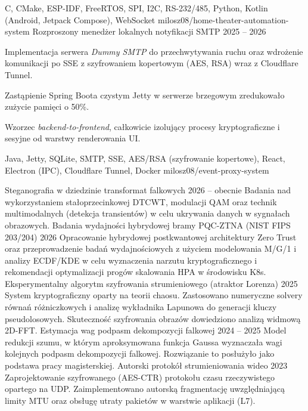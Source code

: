   {C, CMake, ESP-IDF, FreeRTOS, SPI, I2C, RS-232/485, Python, Kotlin (Android, Jetpack Compose), WebSocket}
  {milosz08/home-theater-automation-system}
\AddProjectEntry
  {Rozproszony menedżer lokalnych notyfikacji SMTP}
  {2025 -- 2026}
  {%
    \item
      Implementacja serwera \textit{Dummy SMTP} do przechwytywania ruchu oraz wdrożenie komunikacji po SSE z
      szyfrowaniem kopertowym (AES, RSA) wraz z Cloudflare Tunnel.
    \item
      Zastąpienie Spring Boota czystym Jetty w serwerze brzegowym zredukowało zużycie pamięci o 50\%.
    \item
      Wzorzec \textit{backend-to-frontend}, całkowicie izolujący procesy kryptograficzne i sesyjne od warstwy
      renderowania UI.
  }
  {Java, Jetty, SQLite, SMTP, SSE, AES/RSA (szyfrowanie kopertowe), React, Electron (IPC), Cloudflare Tunnel, Docker}
  {milosz08/event-proxy-system}


\newcommand{\IndependentResearchTitle}{Niezależna działaność badawcza}
\renewcommand{\ResearchList}{}
\AddResearchEntry
  {Steganografia w dziedzinie transformat falkowych}
  {2026 -- obecnie}
  {%
    Badania nad wykorzystaniem stałoprzecinkowej DTCWT, modulacji QAM oraz technik multimodalnych (detekcja transientów)
    w celu ukrywania danych w sygnałach obrazowych.
  }
\AddResearchEntry
  {Badania wydajności hybrydowej bramy PQC-ZTNA (NIST FIPS 203/204)}
  {2026}
  {%
    Opracowanie hybrydowej postkwantowej architektury Zero Trust oraz przeprowadzenie badań wydajnościowych z użyciem
    modelowania M/G/1 i analizy ECDF/KDE w celu wyznaczenia narzutu kryptograficznego i rekomendacji optymalizacji
    progów skalowania HPA w środowisku K8s.
  }
\AddResearchEntry
  {Eksperymentalny algorytm szyfrowania strumieniowego (atraktor Lorenza)}
  {2025}
  {%
    System kryptograficzny oparty na teorii chaosu. Zastosowano numeryczne solvery równań różniczkowych i analizę
    wykładnika Lapunowa do generacji kluczy pseudolosowych. Skuteczność szyfrowania obrazów dowiedziono analizą widmową
    2D-FFT.
  }
\AddResearchEntry
  {Estymacja wag podpasm dekompozycji falkowej}
  {2024 -- 2025}
  {
    Model redukcji szumu, w którym aproksymowana funkcja Gaussa wyznaczała wagi kolejnych podpasm dekompozycji falkowej.
    Rozwiązanie to posłużyło jako podstawa pracy magisterskiej.
  }
\AddResearchEntry
  {Autorski protokół strumieniowania wideo}
  {2023}
  {%
    Zaprojektowanie szyfrowanego (AES-CTR) protokołu czasu rzeczywistego opartego na UDP. Zaimplementowano autorską
    fragmentację uwzględniającą limity MTU oraz obsługę utraty pakietów w warstwie aplikacji (L7).
  }

